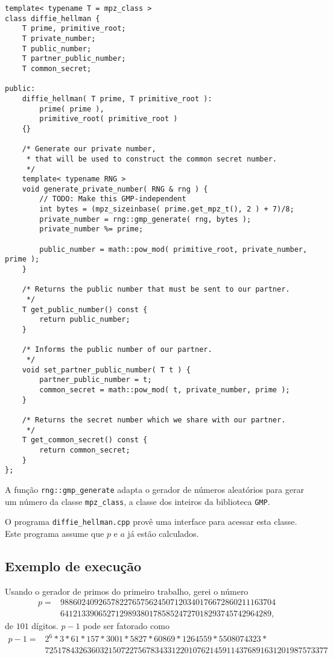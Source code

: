 \documentclass{article}
\begin{document}
\begin{verbatim}
template< typename T = mpz_class >
class diffie_hellman {
    T prime, primitive_root;
    T private_number;
    T public_number;
    T partner_public_number;
    T common_secret;

public:
    diffie_hellman( T prime, T primitive_root ):
        prime( prime ),
        primitive_root( primitive_root )
    {}

    /* Generate our private number,
     * that will be used to construct the common secret number.
     */
    template< typename RNG >
    void generate_private_number( RNG & rng ) {
        // TODO: Make this GMP-independent
        int bytes = (mpz_sizeinbase( prime.get_mpz_t(), 2 ) + 7)/8;
        private_number = rng::gmp_generate( rng, bytes );
        private_number %= prime;

        public_number = math::pow_mod( primitive_root, private_number, prime );
    }

    /* Returns the public number that must be sent to our partner.
     */
    T get_public_number() const {
        return public_number;
    }

    /* Informs the public number of our partner.
     */
    void set_partner_public_number( T t ) {
        partner_public_number = t;
        common_secret = math::pow_mod( t, private_number, prime );
    }

    /* Returns the secret number which we share with our partner.
     */
    T get_common_secret() const {
        return common_secret;
    }
};
\end{verbatim}

A função \verb"rng::gmp_generate" adapta o gerador de números aleatórios
para gerar um número da classe \verb"mpz_class",
a classe dos inteiros da biblioteca \verb"GMP".

O programa \verb"diffie_hellman.cpp" provê uma interface
para acessar esta classe.
Este programa assume que $p$ e $a$ já estão calculados.

\subsection{Exemplo de execução}

Usando o gerador de primos do primeiro trabalho,
gerei o número
\begin{align*}
    p = & 988602409265782276575624507120340176672860211163704 \\
        & 64121339065271298938017858524727018293745742964289,
\end{align*}
de $101$ dígitos.
$p-1$ pode ser fatorado como
\begin{align*}
    p-1 = & 2^6 * 3 * 61 * 157 * 3001 * 5827 * 60869 * 1264559 * 5508074323 * \\
          & 7251784326360321507227567834331220107621459114376891631201987573377
\end{align*}
\end{document}
